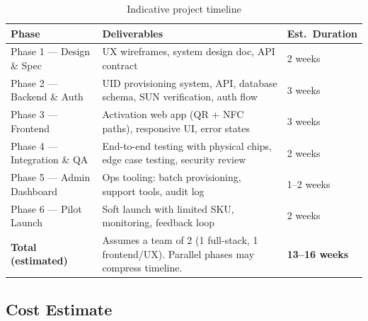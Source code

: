 \documentclass[
	a4paper, %
]{ChaosEngineReport}
\begin{document}
\begin{table}[h!]
\centering
\small
{}
\begin{tabularx}{\linewidth}{@{} L{2.8cm} X L{2.4cm} @{}}
  \toprule
  \textbf{Phase} &
  \textbf{Deliverables} &
  \textbf{Est.\ Duration} \\
  \midrule
  Phase 1 — Design \& Spec & UX wireframes, system design doc, API contract & 2 weeks \\
  Phase 2 — Backend \& Auth & UID provisioning system, API, database schema, SUN verification, auth flow & 3 weeks \\
  Phase 3 — Frontend & Activation web app (QR + NFC paths), responsive UI, error states & 3 weeks \\
  Phase 4 — Integration \& QA & End-to-end testing with physical chips, edge case testing, security review & 2 weeks \\
  Phase 5 — Admin Dashboard & Ops tooling: batch provisioning, support tools, audit log & 1--2 weeks \\
  Phase 6 — Pilot Launch & Soft launch with limited SKU, monitoring, feedback loop & 2 weeks \\
  \textbf{Total (estimated)} & Assumes a team of 2 (1 full-stack, 1 frontend/UX). Parallel phases may compress timeline. & \textbf{\color{Gold}13--16 weeks} \\
\end{tabularx}
\caption{Indicative project timeline}
\end{table}

\subsection{Cost Estimate}
\end{document}
